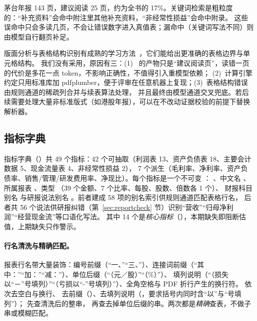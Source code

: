 茅台年报 143 页，建议阅读 25 页，约为全书的 17\%。关键词检索是粗粒度的：“补充资料”会命中附注里其他补充资料，“非经常性损益”会命中附录。
这些误命中只会多读几页，不会让错误数字进入真值表；漏命中（关键词写法不同）则由模型自行翻页补足。

\begin{tradeoff}
版面分析与表格结构识别有成熟的学习方法~\citep{smock2022pubtables,nassar2022tableformer,auer2024docling}，它们能给出更准确的表格边界与单元格结构。
我们没有采用，原因有三：(1)~ 的产物只是“建议阅读页”，读错一页的代价是多花一点 token，不影响正确性，不值得引入重模型依赖；
(2)~计算引擎约定只用标准库加 pdfplumber，便于评审在任意机器上复现；(3)~表格结构错误由规则通道的稀疏列合并与续表算法处理，
并且最终由模型通道交叉兜底。若后续需要处理大量非标准版式（如港股年报），可以在不改动证据校验的前提下替换解析器。
\end{tradeoff}

\subsection{指标字典}
\label{sec:ext-schema}

指标字典（）共 49 个指标：42 个可抽取（利润表 13、资产负债表 18、主要会计数据 5、现金流量表 4、非经常性损益 2），
7 个派生（毛利率、净利率、资产负债率、销售/管理/研发费用率、净现比）。每个指标是一个不可变 ：
、中文名 、所属报表 、类型 （39 个金额、7 个比率、每股、股数、倍数各 1 个）、
财报科目别名  与研报说法别名 。前者建成 58 项的别名索引供规则通道匹配表格行名，
后者共 56 个说法供研报纠错（第~\ref{sec:reportcheck} 节）识别“营收”“归母净利润”“经营现金流”等口语化写法。
其中 14 个是\emph{核心指标}（），本期缺失即阻断估值，上期缺失只作警示。

\paragraph{行名清洗与精确匹配。}
报表行名带大量装饰：编号前缀（“一、”“三、”）、连接词前缀（“其中：”“加：”“减：”）、单位后缀（“（元／股）”“（\%）”）、
填列说明（“（损失以“－”号填列）”“（亏损以“-”号填列）”）、全角空格与 PDF 折行产生的换行符。 依次去空白与换行、
去前缀（）、去填列说明（，要求括号内同时含“以”与“号填列”）； 先查清洗后的整串，
再查去掉单位后缀的串。两次都是\emph{精确}查表，不做子串或模糊匹配。

